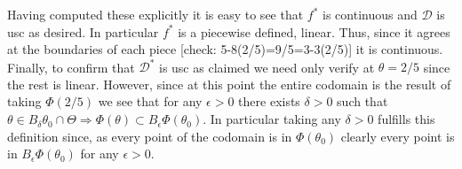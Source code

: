 \documentclass[12pt]{article}
\begin{document}
Having computed these explicitly it is easy to see that $f^*$ is continuous and $\mathcal{D}$ is usc as desired. In particular $f^*$ is a piecewise defined, linear. Thus, since it agrees at the boundaries of each piece [check: 5-8(2/5)=9/5=3-3(2/5)] it is continuous. Finally, to confirm that $\mathcal{D}^*$ is usc as claimed we need only verify at $\theta = 2/5$ since the rest is linear. However, since at this point the entire codomain is the result of taking $\Phi(2/5)$  we see that for any $\epsilon > 0$ there exists $\delta > 0$ such that $\theta \in B_\delta \theta_0 \cap \Theta \Rightarrow \Phi(\theta) \subset B_\epsilon \Phi(\theta_0)$. In particular taking any $\delta >0$ fulfills this definition since, as every point of the codomain is in $ \Phi(\theta_0)$ clearly every point is in $B_\epsilon \Phi(\theta_0)$ for any $\epsilon>0$.
\end{document}
